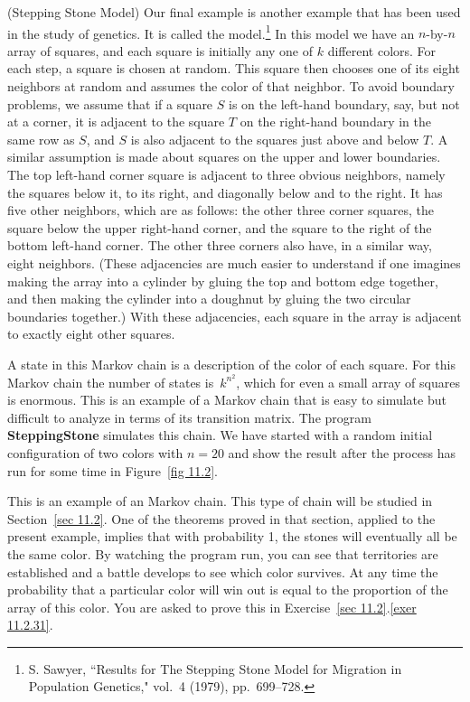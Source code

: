 \begin{example} \label{exam 11.1.10}
(Stepping Stone Model)  Our final example is another example that has been used
in the
study of genetics.  It is called the  model.\footnote{S.
Sawyer, ``Results for The Stepping Stone Model for Migration in Population
Genetics,"  vol.~4 (1979),
pp.~699--728.}  In this
model we have an $n$-by-$n$ array of squares, and each square is initially any
one of $k$ different colors.  For each step, a square is chosen at random. 
This
square then chooses one of its eight neighbors at random and assumes the color
of that neighbor.  To avoid boundary problems, we assume that if a square $S$
is on the
left-hand boundary, say, but not at a corner, it is adjacent to the square $T$
on the
right-hand boundary in the same row as $S$, and $S$ is also adjacent to the
squares
just above and below $T$.  A similar assumption is made about squares on the
upper and
lower boundaries.  The top left-hand corner square is adjacent to three obvious neighbors, namely the squares below it,  to its right, and diagonally below and to the right.  It has five other neighbors, which are as follows:  the other three corner squares, the square below the upper right-hand corner, and the square to the right of the bottom left-hand corner.  The other three corners also have, in a similar way, eight neighbors.  (These adjacencies are much easier to understand if one
imagines
making the array into a cylinder by gluing the top and bottom edge together,
and then
making the cylinder into a doughnut by gluing the two circular boundaries
together.) 
With these adjacencies, each square in the array is adjacent to exactly eight
other
squares.
\par
A state in this Markov chain is a description of the color of
each square.  For this Markov chain the number of states is~$k^{n^2}$, which
for
even a small array of squares is enormous.  This is an example of a Markov
chain that is easy to simulate but difficult to analyze in terms of its
transition matrix.  The program {\bf SteppingStone} simulates
this chain.  We have started with a random initial configuration of two colors
with $n = 20$ and show the result after the process has run for some time in
Figure~\ref{fig 11.2}.
\noindent
\par
This is an example of an  Markov chain.  This type of chain
will be studied in
Section~\ref{sec 11.2}.  One of the theorems proved in that section, applied to
the present
example, implies that with
probability 1, the stones will eventually all be the same color.  By watching
the program run, you
can see that territories are established and a battle develops to see which
color survives.  At
any time the probability that a particular color will win out is equal to the
proportion of the
array of this color.  You are asked to prove this in Exercise~\ref{sec
11.2}.\ref{exer 11.2.31}.
\end{example}

